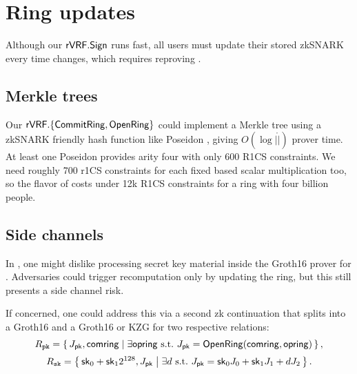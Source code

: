 \section{Ring updates}
\label{sec:ring_updates}


Although our ${\mathsf{rVRF}}.{\mathsf{Sign}}$ runs fast, all users must update their
stored zkSNARK \pifast every time \ring changes, which requires reproving \OpenRing.


\subsection{Merkle trees} %

Our ${\mathsf{rVRF}}.\{ {\mathsf{CommitRing}}, {\mathsf{OpenRing}} \}$ could implement a Merkle tree
using a zkSNARK friendly hash function like Poseidon \cite{poseidon},
giving $O(\log |\ring|)$ prover time.
%
At least one Poseidon \cite{poseidon} provides arity four with only
600 R1CS constraints.  We need roughly 700 r1CS constraints for each
fixed based scalar multiplication too, so the flavor of \pifast costs
under 12k R1CS constraints for a ring with four billion people.



\subsection{Side channels}
\label{subsec:rvrf_side_channel}

In \pifast, one might dislike processing secret key material inside
the Groth16 prover for \pifast.
Adversaries could trigger \pifast recomputation only by updating the ring,
but this still presents a side channel risk.

If concerned, one could address this via a second zk continuation that
splits \pifast into a Groth16 \pisk and a Groth16 or KZG \pipk for two
respective relations:
%
$$ \Lpk = \Setst{ J_\pk, \comring }{
	\exists \openring \textrm{\ s.t.\ }
	J_\pk = \eprint{\rVRF.}{}\OpenRing(\comring,\openring)
} \mathcomma \eprint{\quad\textrm{and}}{} $$ 
%
$$ \Lsk = \Setst{ \sk_0 + \sk_1 2^{128}, J_\pk }{ 
	\exists d \textrm{\ s.t.\ }
	J_\pk = \sk_0 \genJ_0 + \sk_1 \genJ_1 + d \genJ_2
} \mathperiod $$

